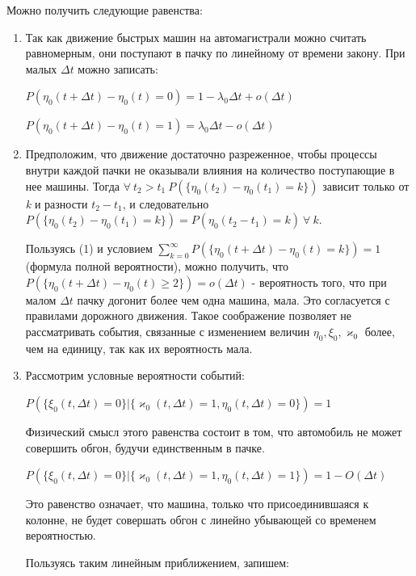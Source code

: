 \documentclass[a4paper, 14pt, russian]{article}
\begin{document}
Можно получить следующие равенства:

\begin{enumerate} 
\item Так как движение быстрых машин на автомагистрали можно считать равномерным, они поступают в пачку по линейному от времени закону. При малых $\Delta t$ можно записать:

$P(\eta_0(t+ \Delta t) - \eta_0(t) = 0) = 1 - \lambda_0 \Delta t + o(\Delta t)$

$P(\eta_0(t+ \Delta t) - \eta_0(t) = 1) = \lambda_0 \Delta t - o(\Delta t)$

\item Предположим, что движение достаточно разреженное, чтобы процессы внутри каждой пачки не оказывали влияния на количество поступающие в нее машины. Тогда $\forall \ t_2 > t_1 \ P(\{\eta_0(t_2) - \eta_0(t_1) = k\})$ зависит только от \textit{k} и разности $t_2 - t_1$, и следовательно $P(\{\eta_0(t_2) - \eta_0(t_1) = k\}) = P({\eta_0(t_2 - t_1) = k}) \ \forall \ k$.

Пользуясь (1) и условием $\sum_{k = 0}^{\infty}P(\{\eta_0(t+\Delta t) - \eta_0(t) = k\}) = 1$ (формула полной вероятности), можно получить, что $P(\{\eta_0(t+\Delta t) - \eta_0(t) \geq 2 \}) = o(\Delta t)$ - вероятность того, что при малом $\Delta t$ пачку догонит более чем одна машина, мала. Это согласуется с правилами дорожного движения. Такое соображение позволяет не рассматривать события, связанные с изменением величин $\eta_0, \xi_0, \varkappa_0$ более, чем на единицу, так как их вероятность мала.


\item Рассмотрим условные вероятности событий:

$P(\{\xi_0(t, \Delta t) = 0\} | \{ \varkappa_0(t, \Delta t) = 1, \eta_0(t, \Delta t) = 0\}) = 1$

Физический смысл этого равенства состоит в том, что автомобиль не может совершить обгон, будучи единственным в пачке.

$P(\{\xi_0(t, \Delta t) = 0\} | \{ \varkappa_0(t, \Delta t) = 1, \eta_0(t, \Delta t) = 1\}) = 1 - O(\Delta t)$

Это равенство означает, что машина, только что присоединившаяся к колонне, не будет совершать обгон с линейно убывающей со временем вероятностью.

Пользуясь таким линейным приближением, запишем:


\end{enumerate}
\end{document}
